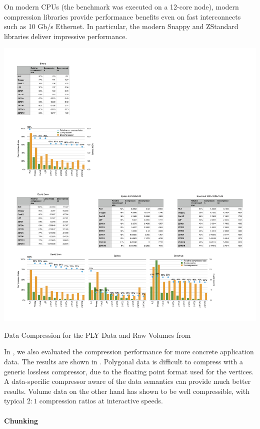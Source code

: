 On modern CPUs (the benchmark was executed on a 12-core node), modern
compression libraries provide performance benefits even on fast interconnects
such as 10 Gb/s Ethernet. In particular, the modern Snappy and ZStandard
libraries deliver impressive performance.

\begin{benchmark}[h!t]\center
  \includegraphics[width=\textwidth]{results/compressorDetail}
  \caption{\label{rCompressorDetail}Data Compression for the PLY Data and Raw Volumes from }
\end{benchmark}

In \cite{ESP:18}, we also evaluated the compression performance for more
concrete application data. The results are shown in .
Polygonal data is difficult to compress with a generic lossless compressor, due
to the floating point format used for the vertices. A data-specific compressor
aware of the data semantics can provide much better results. Volume data on the
other hand has shown to be well compressible, with typical $2:1$ compression
ratios at interactive speeds.

\paragraph{Chunking}

